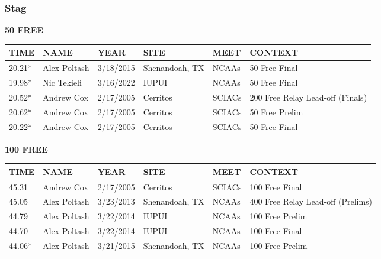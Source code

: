 \subsubsection{Stag}

\begin{table}[H]
\centering
\begin{minipage}[t]{0.48\textwidth}
\centering
\textbf{50 FREE}\\[0.1cm]
\begin{tabular}{@{}p{1.8cm}p{2.8cm}p{1.2cm}p{1.4cm}p{1.4cm}p{2.0cm}@{}}
\hline
    \textbf{TIME} & \textbf{NAME} & \textbf{YEAR} & \textbf{SITE} & \textbf{MEET} & \textbf{CONTEXT} \\
\hline
    20.21* & Alex Poltash & 3/18/2015 & Shenandoah, TX & NCAAs & 50 Free Final \\
    19.98* & Nic Tekieli & 3/16/2022 & IUPUI & NCAAs & 50 Free Final \\
    20.52* & Andrew Cox & 2/17/2005 & Cerritos & SCIACs & 200 Free Relay Lead-off (Finals) \\
    20.62* & Andrew Cox & 2/17/2005 & Cerritos & SCIACs & 50 Free Prelim \\
    20.22* & Andrew Cox & 2/17/2005 & Cerritos & SCIACs & 50 Free Final \\
\hline
\end{tabular}
\end{minipage}\hfill
\begin{minipage}[t]{0.48\textwidth}
\centering
\textbf{100 FREE}\\[0.1cm]
\begin{tabular}{@{}p{1.8cm}p{2.8cm}p{1.2cm}p{1.4cm}p{1.4cm}p{2.0cm}@{}}
\hline
    \textbf{TIME} & \textbf{NAME} & \textbf{YEAR} & \textbf{SITE} & \textbf{MEET} & \textbf{CONTEXT} \\
\hline
    45.31 & Andrew Cox & 2/17/2005 & Cerritos & SCIACs & 100 Free Final \\
    45.05 & Alex Poltash & 3/23/2013 & Shenandoah, TX & NCAAs & 400 Free Relay Lead-off (Prelims) \\
    44.79 & Alex Poltash & 3/22/2014 & IUPUI & NCAAs & 100 Free Prelim \\
    44.70 & Alex Poltash & 3/22/2014 & IUPUI & NCAAs & 100 Free Final \\
    44.06* & Alex Poltash & 3/21/2015 & Shenandoah, TX & NCAAs & 100 Free Prelim \\
\hline
\end{tabular}
\end{minipage}
\end{table}


